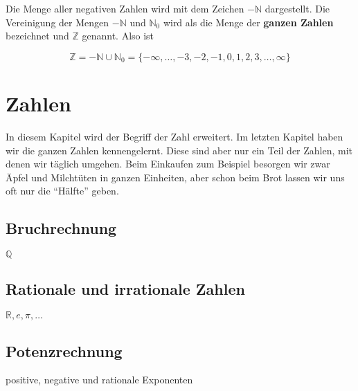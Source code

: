 Die Menge aller negativen Zahlen wird mit dem Zeichen $-\mathbb{N} $ dargestellt. Die Vereinigung der Mengen $-\mathbb{N} $ und $\mathbb{N}_0$ wird als die Menge der \textbf{ganzen Zahlen} bezeichnet und $\mathbb{Z}$ genannt. Also ist 

\[
\mathbb{Z} = -\mathbb{N} \cup \mathbb{N}_0 =  \{ -\infty, \dots, -3, -2, -1, 0, 1, 2, 3, \dots, \infty \}
\]


\chapter{Zahlen}

In diesem Kapitel wird der Begriff der Zahl erweitert. Im letzten Kapitel haben wir die ganzen Zahlen kennengelernt. Diese sind aber nur ein Teil der Zahlen, mit denen wir täglich umgehen. Beim Einkaufen zum Beispiel besorgen wir zwar Äpfel und Milchtüten in ganzen Einheiten, aber schon beim Brot lassen wir uns oft nur die "`Hälfte"' geben. 

\section{Bruchrechnung}

$\mathbb{Q}$

\section{Rationale und irrationale Zahlen}

$\mathbb{R}, e, \pi, \dots $

\section{Potenzrechnung}

positive, negative und rationale Exponenten


\begin{example}

\end{example}
\begin{question}

\end{question}
\begin{solution}

\end{solution}

